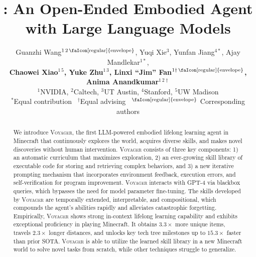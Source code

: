 \documentclass{article}
\title{\voyager: An Open-Ended Embodied Agent\\ with Large Language Models}
\author{%
    Guanzhi Wang$^{1\,2\,\text{\faIcon[regular]{envelope}}}$, Yuqi Xie$^3$, Yunfan Jiang$^{4*}$, Ajay Mandlekar$^{1*}$,\\
    \textbf{Chaowei Xiao$^{1\,5}$, Yuke Zhu$^{1\,3}$, Linxi ``Jim'' Fan$^{1\dagger\,\text{\faIcon[regular]{envelope}}}$, Anima Anandkumar$^{1\,2 \dagger}$}\\
    $^1$NVIDIA, $^2$Caltech, $^3$UT Austin, $^4$Stanford, $^5$UW Madison\\
    $^*$Equal contribution \, $^\dagger$Equal advising \, $^\text{\faIcon[regular]{envelope}}$ Corresponding authors\\
    \weburl
}
\newcommand{\voyager}[0]{\mbox{\textsc{Voyager}}\xspace}
\begin{document}
\maketitle
\vspace{-1.5em}
\begin{abstract}
We introduce \voyager, the first LLM-powered embodied lifelong learning agent in Minecraft that continuously explores the world, acquires diverse skills, and makes novel discoveries without human intervention. \voyager consists of three key components: 1) an automatic curriculum that maximizes exploration, 2) an ever-growing skill library of executable code for storing and retrieving complex behaviors, and 3) a new iterative prompting mechanism that incorporates environment feedback, execution errors, and self-verification for program improvement. 
\voyager interacts with GPT-4 via blackbox queries, which bypasses the need for model parameter fine-tuning. The skills developed by \voyager are temporally extended, interpretable, and compositional, which compounds the agent's abilities rapidly and alleviates catastrophic forgetting. 
Empirically, \voyager shows strong in-context lifelong learning capability and exhibits exceptional proficiency in playing Minecraft.
It obtains $3.3 \times$ more unique items, travels $2.3 \times$ longer distances, and unlocks key tech tree milestones up to $15.3 \times$ faster than prior SOTA. \voyager is able to utilize the learned skill library in a new Minecraft world to solve novel tasks from scratch, while other techniques struggle to generalize.

\end{abstract}
\vspace{-0.3em}










\newpage
\appendix
\onecolumn

\end{document}
